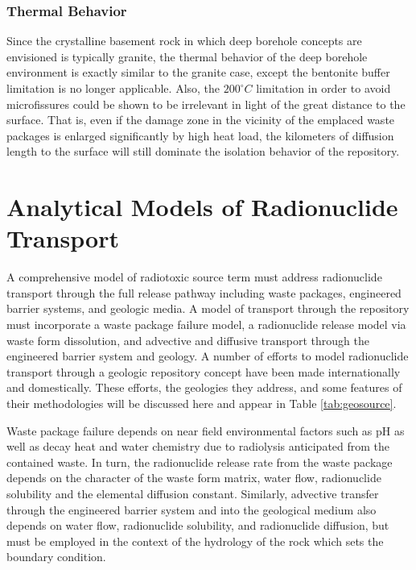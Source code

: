 \subsubsection{Thermal Behavior}
\label{subsec:boreholethermal}

Since the crystalline basement rock in which deep borehole concepts are 
envisioned is typically granite, the thermal behavior of the deep borehole 
environment is exactly similar to the granite case, except the bentonite buffer 
limitation is no longer applicable.  Also, the $200^{\circ}C$ limitation in 
order to avoid microfissures could  be shown to be irrelevant in light of the 
great distance to the surface. That is, even if the damage zone in the vicinity 
of the emplaced waste packages is enlarged significantly by high heat load, 
the kilometers of diffusion length to the surface will still dominate the 
isolation behavior of the repository. 



\section{Analytical Models of Radionuclide Transport} \label{sec:analytical_nuc}


A comprehensive model of radiotoxic source term must address radionuclide transport
through the full release pathway including waste packages, engineered barrier
systems, and geologic media. A model of transport through the repository 
must incorporate a waste package failure model, a radionuclide release model via 
waste form dissolution, and advective and diffusive transport through the 
engineered barrier system and geology. A number of efforts to model 
radionuclide transport through a geologic repository concept have been made 
internationally and domestically. These efforts, the geologies they address, and  
some features of their methodologies will be discussed here and appear in Table 
\ref{tab:geosource}.



Waste package failure depends on near field environmental factors such as
pH as well as decay heat and water chemistry due to radiolysis anticipated from the
contained waste.  In turn, the radionuclide release rate from the waste package
depends on the character of the waste form matrix, water flow,
radionuclide solubility and the elemental diffusion constant.  Similarly, advective
transfer through the engineered barrier system and into the geological medium
also depends on water flow, radionuclide solubility, and radionuclide diffusion, but must
be employed in the context of the hydrology of the rock which sets the boundary    
condition.

